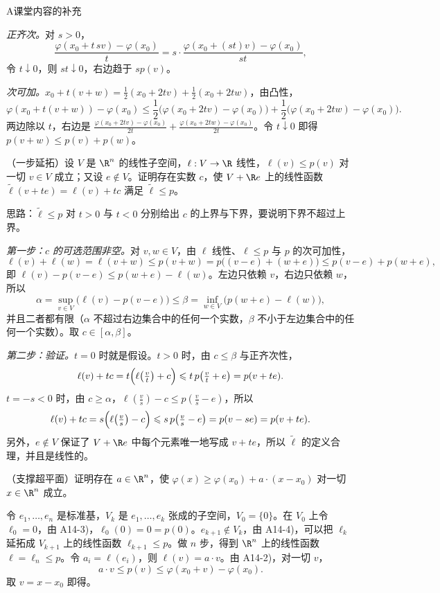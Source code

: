 \begin{exercises}{A}{课堂内容的补充}
\begin{questions}
\begin{solution}
\emph{正齐次。}对 $s>0$，
\[
\frac{\varphi(x_0+t\,sv)-\varphi(x_0)}t=s\cdot\frac{\varphi(x_0+(st)v)-\varphi(x_0)}{st},
\]
令 $t\downarrow0$，则 $st\downarrow0$，右边趋于 $sp(v)$。

\emph{次可加。}$x_0+t(v+w)=\frac12(x_0+2tv)+\frac12(x_0+2tw)$，由凸性，
\[
\varphi(x_0+t(v+w))-\varphi(x_0)\leqslant\frac12\bigl(\varphi(x_0+2tv)-\varphi(x_0)\bigr)+\frac12\bigl(\varphi(x_0+2tw)-\varphi(x_0)\bigr).
\]
两边除以 $t$，右边是 $\frac{\varphi(x_0+2tv)-\varphi(x_0)}{2t}+\frac{\varphi(x_0+2tw)-\varphi(x_0)}{2t}$。令 $t\downarrow0$ 即得 $p(v+w)\leqslant p(v)+p(w)$。
\end{solution}
\item （一步延拓）设 $V$ 是 $\R^n$ 的线性子空间，$\ell:V\to\R$ 线性，$\ell(v)\leqslant p(v)$ 对一切 $v\in V$ 成立；又设 $e\notin V$。证明存在实数 $c$，使 $V+\R e$ 上的线性函数 $\tilde\ell(v+te)=\ell(v)+tc$ 满足 $\tilde\ell\leqslant p$。
\begin{solution}
思路：$\tilde\ell\leqslant p$ 对 $t>0$ 与 $t<0$ 分别给出 $c$ 的上界与下界，要说明下界不超过上界。

\emph{第一步：$c$ 的可选范围非空。}对 $v,w\in V$，由 $\ell$ 线性、$\ell\leqslant p$ 与 $p$ 的次可加性，
\[
\ell(v)+\ell(w)=\ell(v+w)\leqslant p(v+w)=p\bigl((v-e)+(w+e)\bigr)\leqslant p(v-e)+p(w+e),
\]
即 $\ell(v)-p(v-e)\leqslant p(w+e)-\ell(w)$。左边只依赖 $v$，右边只依赖 $w$，所以
\[
\alpha=\sup_{v\in V}\bigl(\ell(v)-p(v-e)\bigr)\leqslant\beta=\inf_{w\in V}\bigl(p(w+e)-\ell(w)\bigr),
\]
并且二者都有限（$\alpha$ 不超过右边集合中的任何一个实数，$\beta$ 不小于左边集合中的任何一个实数）。取 $c\in[\alpha,\beta]$。

\emph{第二步：验证。}$t=0$ 时就是假设。$t>0$ 时，由 $c\leqslant\beta$ 与正齐次性，
\[
\ell(v)+tc=t\Bigl(\ell\bigl(\tfrac vt\bigr)+c\Bigr)\leqslant t\,p\bigl(\tfrac vt+e\bigr)=p(v+te).
\]
$t=-s<0$ 时，由 $c\geqslant\alpha$，$\ell(\frac vs)-c\leqslant p(\frac vs-e)$，所以
\[
\ell(v)+tc=s\Bigl(\ell\bigl(\tfrac vs\bigr)-c\Bigr)\leqslant s\,p\bigl(\tfrac vs-e\bigr)=p(v-se)=p(v+te).
\]
另外，$e\notin V$ 保证了 $V+\R e$ 中每个元素唯一地写成 $v+te$，所以 $\tilde\ell$ 的定义合理，并且是线性的。
\end{solution}
\item （支撑超平面）证明存在 $a\in\R^n$，使 $\varphi(x)\geqslant\varphi(x_0)+a\cdot(x-x_0)$ 对一切 $x\in\R^n$ 成立。
\begin{solution}
令 $e_1,\dots,e_n$ 是标准基，$V_k$ 是 $e_1,\dots,e_k$ 张成的子空间，$V_0=\{0\}$。在 $V_0$ 上令 $\ell_0=0$，由 A14-3)，$\ell_0(0)=0=p(0)$。$e_{k+1}\notin V_k$，由 A14-4)，可以把 $\ell_k$ 延拓成 $V_{k+1}$ 上的线性函数 $\ell_{k+1}\leqslant p$。做 $n$ 步，得到 $\R^n$ 上的线性函数 $\ell=\ell_n\leqslant p$。令 $a_i=\ell(e_i)$，则 $\ell(v)=a\cdot v$。由 A14-2)，对一切 $v$，
\[
a\cdot v\leqslant p(v)\leqslant\varphi(x_0+v)-\varphi(x_0).
\]
取 $v=x-x_0$ 即得。


\end{solution}
\end{questions}
\end{exercises}
